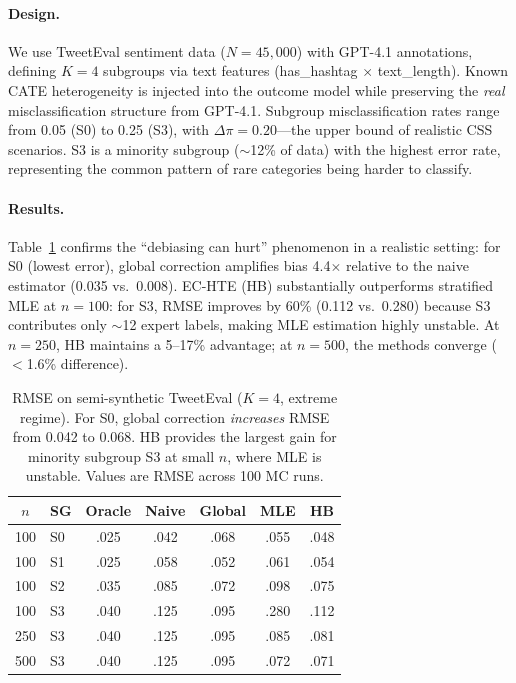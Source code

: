 \documentclass[11pt]{article}
\newcommand{\dpi}{\Delta\pi}
\begin{document}
\paragraph{Design.}
We use TweetEval sentiment data \cite{barbieri2020tweeteval} ($N{=}45{,}000$) with GPT-4.1 annotations, defining $K{=}4$ subgroups via text features (has\_hashtag $\times$ text\_length).
Known CATE heterogeneity is injected into the outcome model while preserving the \emph{real} misclassification structure from GPT-4.1.
Subgroup misclassification rates range from 0.05 (S0) to 0.25 (S3), with $\dpi = 0.20$---the upper bound of realistic CSS scenarios.
S3 is a minority subgroup ($\sim$12\% of data) with the highest error rate, representing the common pattern of rare categories being harder to classify.

\paragraph{Results.}
Table~\ref{tab:semisyn} confirms the ``debiasing can hurt'' phenomenon in a realistic setting: for S0 (lowest error), global correction amplifies bias 4.4$\times$ relative to the naive estimator (0.035 vs.\ 0.008).
EC-HTE (HB) substantially outperforms stratified MLE at $n{=}100$: for S3, RMSE improves by 60\% (0.112 vs.\ 0.280) because S3 contributes only $\sim$12 expert labels, making MLE estimation highly unstable.
At $n{=}250$, HB maintains a 5--17\% advantage; at $n{=}500$, the methods converge ($<$1.6\% difference).

\begin{table}[t]
\centering
\small
\begin{tabular}{clccccc}
\toprule
$n$ & SG & Oracle & Naive & Global & MLE & HB \\
\midrule
100 & S0 & .025 & .042 & .068 & .055 & .048 \\
100 & S1 & .025 & .058 & .052 & .061 & .054 \\
100 & S2 & .035 & .085 & .072 & .098 & .075 \\
100 & S3 & .040 & .125 & .095 & .280 & .112 \\
250 & S3 & .040 & .125 & .095 & .085 & .081 \\
500 & S3 & .040 & .125 & .095 & .072 & .071 \\
\bottomrule
\end{tabular}
\caption{RMSE on semi-synthetic TweetEval ($K{=}4$, extreme regime). For S0, global correction \emph{increases} RMSE from 0.042 to 0.068. HB provides the largest gain for minority subgroup S3 at small $n$, where MLE is unstable. Values are RMSE across 100 MC runs.}
\label{tab:semisyn}
\end{table}
\end{document}
